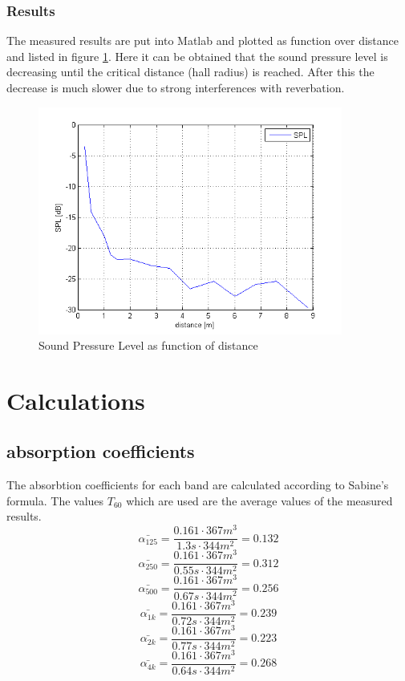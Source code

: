 \documentclass{article}
\begin{document}
\subsubsection{Results}
The measured results are put into Matlab and plotted as function over distance and listed in figure \ref{fig:spl}. Here it can be obtained that the sound pressure level is decreasing until the critical distance (hall radius) is reached. After this the decrease is much slower due to strong interferences with reverbation.
\begin{figure}[htbp]
\begin{center}
\includegraphics[width=10cm,keepaspectratio=true]{SPL}
\caption{Sound Pressure Level as function of distance}
\label{fig:spl}
\end{center}
\end{figure}

\section{Calculations}
\subsection{absorption coefficients}
The absorbtion coefficients for each band are calculated according to Sabine's formula. The values $T_{60}$ which are used are the average values of the measured results. 
$$\bar{\alpha_{125}}=\frac{0.161\cdot 367m^3}{1.3s\cdot 344m^2}=0.132$$
$$\bar{\alpha_{250}}=\frac{0.161\cdot 367m^3}{0.55s\cdot 344m^2}=0.312$$
$$\bar{\alpha_{500}}=\frac{0.161\cdot 367m^3}{0.67s\cdot 344m^2}=0.256$$
$$\bar{\alpha_{1k}}=\frac{0.161\cdot 367m^3}{0.72s\cdot 344m^2}=0.239$$
$$\bar{\alpha_{2k}}=\frac{0.161\cdot 367m^3}{0.77s\cdot 344m^2}=0.223$$
$$\bar{\alpha_{4k}}=\frac{0.161\cdot 367m^3}{0.64s\cdot 344m^2}=0.268$$
\end{document}

